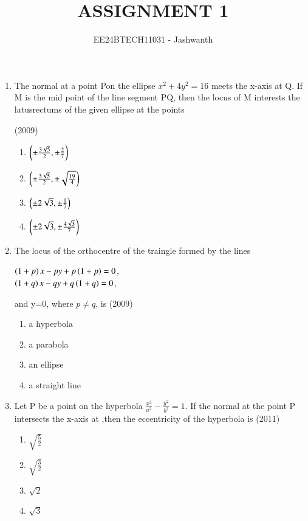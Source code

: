 \documentclass[journal,12pt,onecolumn]{IEEEtran}
\theoremstyle{remark}
\begin{document}

\vspace{3cm}

\title{ASSIGNMENT 1}
\author{EE24BTECH11031 - Jashwanth}
\maketitle

\bigskip

\begin{enumerate}
\item The normal at a point Pon the ellipse  $x^2 +4y^2=16$ meets the x-axis at Q. If M is the mid point of the line segment PQ, then the locus of M interests the latusrectums of the given ellipse at the points
	
	\hfill (2009)
		\begin{enumerate}
			\item $\left(\pm\frac{3\sqrt{5}}{2},\pm\frac{2}{7}\right)$
			\item $\left(\pm\frac{3\sqrt{5}}{2},\pm\sqrt{\frac{19}{4}}\right)$
			\item $\left(\pm2\sqrt{3},\pm\frac{1}{7}\right)$
			\item $\left(\pm2\sqrt{3},\pm\frac{4\sqrt{3}}{7}\right)$	
		\end{enumerate}
		
	\item The locus of the orthocentre of the traingle formed by the lines\\
		\begin{center}
			$\left(1+p\right)x-py+p\left(1+p\right)=0$,\\
			$\left(1+q\right)x-qy+q\left(1+q\right)=0$,\\
		\end{center}
		and y=0, where $p \neq q$, is
		\hfill(2009)
\begin{enumerate}
	\item a hyperbola
	\item a parabola
	\item an ellipse
	\item a straight line
\end{enumerate}

\item Let P be a point on the hyperbola $\frac{x^2}{a^2}-\frac{y^2}{b^2}=1$. If the normal at the point P intersects the x-axis at ,then the eccentricity of the hyperbola is
	\hfill (2011)\\
		\begin{enumerate}
			\item$\sqrt{\frac{5}{2}}$
			\item$\sqrt{\frac{3}{2}}$
			\item$\sqrt{2}$
			\item$\sqrt{3}$
		\end{enumerate}


\end{enumerate}
\end{document}
